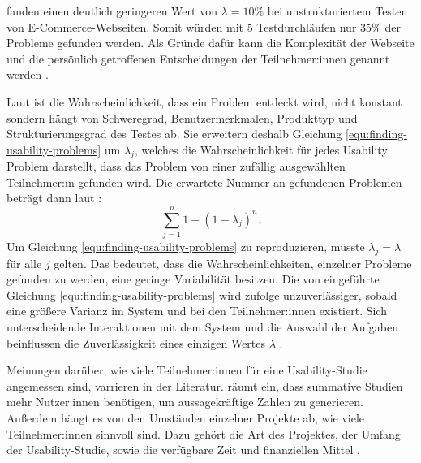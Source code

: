 \textcite{spoolTestingWeb2001} fanden einen deutlich geringeren Wert von $\lambda{}=10\%$ bei unstrukturiertem Testen von E-Commerce-Webseiten. Somit würden mit 5 Testdurchläufen nur 35\% der Probleme gefunden werden. Als Gründe dafür kann die Komplexität der Webseite und die persönlich getroffenen Entscheidungen der Teilnehmer:innen genannt werden \parencite{spoolTestingWeb2001}.

Laut \textcite{woolrychWhyWhen2001} ist die Wahrscheinlichkeit, dass ein Problem entdeckt wird, nicht konstant sondern hängt von Schweregrad, Benutzermerkmalen, Produkttyp und Strukturierungsgrad des Testes ab. Sie erweitern deshalb Gleichung \ref{equ:finding-usability-problems} um $\lambda{}_j$, welches die Wahrscheinlichkeit für jedes Usability Problem darstellt, dass das Problem von einer zufällig ausgewählten Teilnehmer:in gefunden wird. Die erwartete Nummer an gefundenen Problemen beträgt dann laut \textcite{woolrychWhyWhen2001}:
\begin{equation}
  \sum_{j=1}^n 1-(1-\lambda{}_j)^n\text{.}
\end{equation}
Um Gleichung \ref{equ:finding-usability-problems} zu reproduzieren, müsste $\lambda{}_j = \lambda{}$ für alle $j$ gelten. Das bedeutet, dass die Wahrscheinlichkeiten, einzelner Probleme gefunden zu werden, eine geringe Variabilität besitzen. Die von \textcite{nielsenMathematicalModel1993} eingeführte Gleichung \ref{equ:finding-usability-problems} wird \textcite{woolrychWhyWhen2001} zufolge unzuverlässiger, sobald eine größere Varianz im System und bei den Teilnehmer:innen existiert. Sich unterscheidende Interaktionen mit dem System und die Auswahl der Aufgaben beinflussen die Zuverlässigkeit eines einzigen Wertes $\lambda{}$ \parencite{woolrychWhyWhen2001}.

Meinungen darüber, wie viele Teilnehmer:innen für eine Usability-Studie angemessen sind, varrieren in der Literatur. \textcite{nielsenHowMany2012} räumt ein, dass summative Studien mehr Nutzer:innen benötigen, um aussagekräftige Zahlen zu generieren. Außerdem hängt es von den Umständen einzelner Projekte ab, wie viele Teilnehmer:innen sinnvoll sind. Dazu gehört die Art des Projektes, der Umfang der Usability-Studie, sowie die verfügbare Zeit und finanziellen Mittel \parencite{nielsenHowMany2012}.
